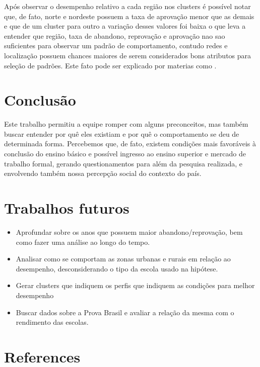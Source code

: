 \documentclass[review]{elsarticle}
\begin{document}
Após observar o desempenho relativo a cada região nos clusters é possível notar que, de fato, norte e nordeste possuem a taxa de aprovação menor que as demais e que de um cluster para outro a variação desses valores foi baixa o que leva a entender que região, taxa de abandono, reprovação e aprovação nao sao suficientes para observar um padrão de comportamento, contudo redes e localização possuem chances maiores de serem considerados bons atributos para seleção de padrões. Este fato pode ser explicado por materias como \cite{UOL2012, G12011}. 

\section{Conclusão}

Este trabalho permitiu a equipe romper com alguns preconceitos, mas também buscar entender por quê eles existiam e por quê o comportamento se deu de determinada forma.
Percebemos que, de fato, existem condições mais favoráveis à conclusão do ensino básico e possível ingresso ao ensino superior e mercado de trabalho formal, gerando questionamentos para além da pesquisa realizada, e envolvendo também nossa percepção social do contexto do país.

\section{Trabalhos futuros}
\begin{itemize}
    \item Aprofundar sobre os anos que possuem maior abandono/reprovação, bem como fazer uma análise ao longo do tempo.
    \item Analisar como se comportam as zonas urbanas e rurais em relação ao desempenho, desconsiderando o tipo da escola usado na hipótese. 
    \item Gerar clusters que indiquem os perfis que indiquem as condições para melhor desempenho
    \item Buscar dados sobre a Prova Brasil e avaliar a relação da mesma com o rendimento das escolas.
\end{itemize}

\section*{References}

\end{document}
